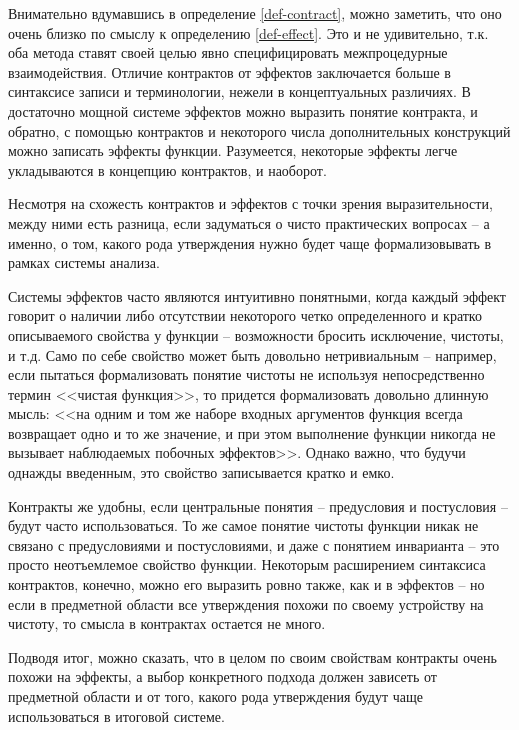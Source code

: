 Внимательно вдумавшись в определение \ref{def-contract}, можно заметить, что оно очень близко по смыслу к определению \ref{def-effect}. Это и не удивительно, т.к. оба метода ставят своей целью явно специфицировать межпроцедурные взаимодействия.  Отличие контрактов от эффектов заключается больше в синтаксисе записи и терминологии, нежели в концептуальных различиях. В достаточно мощной системе эффектов можно выразить понятие контракта, и обратно, с помощью контрактов и некоторого числа дополнительных конструкций можно записать эффекты функции. Разумеется, некоторые эффекты легче укладываются в концепцию контрактов, и наоборот. 

Несмотря на схожесть контрактов и эффектов с точки зрения выразительности, между ними есть разница, если задуматься о чисто практических вопросах -- а именно, о том, какого рода утверждения нужно будет чаще формализовывать в рамках системы анализа. 

Системы эффектов часто являются интуитивно понятными, когда каждый эффект говорит о наличии либо отсутствии некоторого четко определенного и кратко описываемого свойства у функции -- возможности бросить исключение, чистоты, и т.д. Само по себе свойство может быть довольно нетривиальным -- например, если пытаться формализовать понятие чистоты не используя непосредственно термин <<чистая функция>>, то придется формализовать довольно длинную мысль: <<на одним и том же наборе входных аргументов функция всегда возвращает одно и то же значение, и при этом выполнение функции никогда не вызывает наблюдаемых побочных эффектов>>. Однако важно, что будучи однажды введенным, это свойство записывается кратко и емко.

Контракты же удобны, если центральные понятия -- предусловия и постусловия -- будут часто использоваться. То же самое понятие чистоты функции никак не связано с предусловиями и постусловиями, и даже с понятием инварианта -- это просто неотъемлемое свойство функции. Некоторым расширением синтаксиса контрактов, конечно, можно его выразить ровно также, как и в эффектов -- но если в предметной области все утверждения похожи по своему устройству на чистоту, то смысла в контрактах остается не много.

Подводя итог, можно сказать, что в целом по своим свойствам контракты очень похожи на эффекты, а выбор конкретного подхода должен зависеть от предметной области и от того, какого рода утверждения будут чаще использоваться в итоговой системе. 






